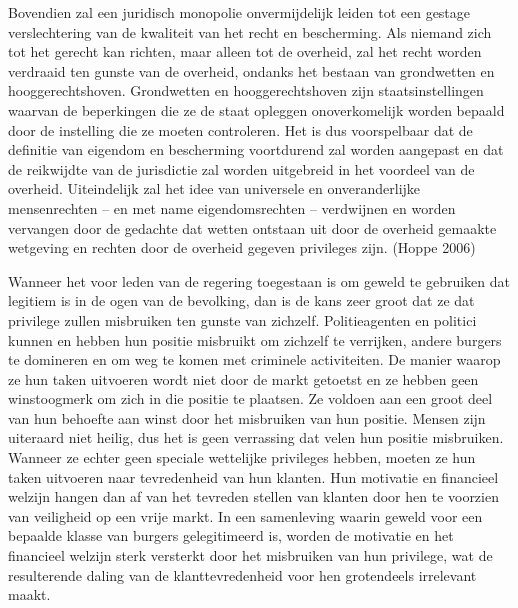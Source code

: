 \documentclass[
  a5paper,
  smalldemyvopaper,11pt,twoside,onecolumn,openright,extrafontsizes,
hidelinks]{memoir}
\begin{document}
Bovendien zal een juridisch monopolie onvermijdelijk leiden tot een
gestage verslechtering van de kwaliteit van het recht en bescherming.
Als niemand zich tot het gerecht kan richten, maar alleen tot de
overheid, zal het recht worden verdraaid ten gunste van de overheid,
ondanks het bestaan van grondwetten en hooggerechtshoven. Grondwetten en
hooggerechtshoven zijn staatsinstellingen waarvan de beperkingen die ze
de staat opleggen onoverkomelijk worden bepaald door de instelling die
ze moeten controleren. Het is dus voorspelbaar dat de definitie van
eigendom en bescherming voortdurend zal worden aangepast en dat de
reikwijdte van de jurisdictie zal worden uitgebreid in het voordeel van
de overheid. Uiteindelijk zal het idee van universele en onveranderlijke
mensenrechten -- en met name eigendomsrechten -- verdwijnen en worden
vervangen door de gedachte dat wetten ontstaan uit door de overheid
gemaakte wetgeving en rechten door de overheid gegeven privileges zijn.
(Hoppe 2006)

Wanneer het voor leden van de regering toegestaan is om geweld te
gebruiken dat legitiem is in de ogen van de bevolking, dan is de kans
zeer groot dat ze dat privilege zullen misbruiken ten gunste van
zichzelf. Politieagenten en politici kunnen en hebben hun positie
misbruikt om zichzelf te verrijken, andere burgers te domineren en om
weg te komen met criminele activiteiten. De manier waarop ze hun taken
uitvoeren wordt niet door de markt getoetst en ze hebben geen
winstoogmerk om zich in die positie te plaatsen. Ze voldoen aan een
groot deel van hun behoefte aan winst door het misbruiken van hun
positie. Mensen zijn uiteraard niet heilig, dus het is geen verrassing
dat velen hun positie misbruiken. Wanneer ze echter geen speciale
wettelijke privileges hebben, moeten ze hun taken uitvoeren naar
tevredenheid van hun klanten. Hun motivatie en financieel welzijn hangen
dan af van het tevreden stellen van klanten door hen te voorzien van
veiligheid op een vrije markt. In een samenleving waarin geweld voor een
bepaalde klasse van burgers gelegitimeerd is, worden de motivatie en het
financieel welzijn sterk versterkt door het misbruiken van hun
privilege, wat de resulterende daling van de klanttevredenheid voor hen
grotendeels irrelevant maakt.
\end{document}
